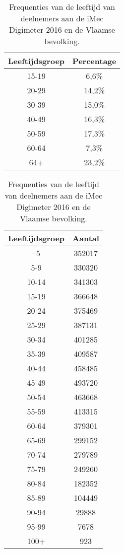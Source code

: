 \begin{table}
  \caption{Frequenties van de leeftijd van deelnemers aan de iMec Digimeter 2016 en de Vlaamse bevolking.}
  \label{tab:frequenties-leeftijden}
  \centering
  \begin{tabular}{cc}
    \textbf{Leeftijdsgroep} & \textbf{Percentage} \\ \midrule
    15-19 & 6,6\% \\
    20-29 & 14,2\% \\
    30-39 & 15,0\% \\
    40-49 & 16,3\% \\
    50-59 & 17,3\% \\
    60-64 & 7,3\% \\
    64+   & 23,2\% \\
  \end{tabular}
  \label{tab:digimeter2016}
  
  \centering
  \begin{tabular}{cc}
    \textbf{Leeftijdsgroep} & \textbf{Aantal} \\ \midrule
    –5            &     352017      \\
    5-9           &     330320      \\
    10-14          &     341303      \\
    15-19          &     366648      \\
    20-24          &     375469      \\
    25-29          &     387131      \\
    30-34          &     401285      \\
    35-39          &     409587      \\
    40-44          &     458485      \\
    45-49          &     493720      \\
    50-54          &     463668      \\
    55-59          &     413315      \\
    60-64          &     379301      \\
    65-69          &     299152      \\
    70-74          &     279789      \\
    75-79          &     249260      \\
    80-84          &     182352      \\
    85-89          &     104449      \\
    90-94          &      29888      \\
    95-99          &      7678       \\
    100+           &       923
  \end{tabular}
  \label{tab:leeftijd-vlaanderen}
  
  
\end{table}

